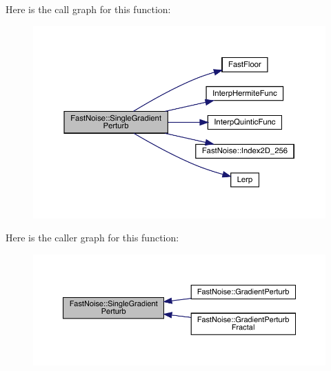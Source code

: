Here is the call graph for this function\+:
\nopagebreak
\begin{figure}[H]
\begin{center}
\leavevmode
\includegraphics[width=350pt]{d1/dd8/class_fast_noise_a10f8238bf167c02937ad19c0f081549a_cgraph}
\end{center}
\end{figure}
Here is the caller graph for this function\+:
\nopagebreak
\begin{figure}[H]
\begin{center}
\leavevmode
\includegraphics[width=350pt]{d1/dd8/class_fast_noise_a10f8238bf167c02937ad19c0f081549a_icgraph}
\end{center}
\end{figure}
\mbox{\label{class_fast_noise_ac584dcaa35fdc6d8af986eba0d3ed50e}} 

